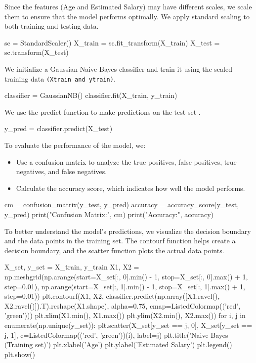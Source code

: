 Since the features (Age and Estimated Salary) may have different scales, we scale them to ensure that the model performs optimally. We apply standard scaling to both training and testing data.
	\begin{python}
		sc = StandardScaler()
		X_train = sc.fit_transform(X_train)
		X_test = sc.transform(X_test)
		
\end{python}



 We initialize a Gaussian Naive Bayes classifier and train it using the scaled training data \texttt{(Xtrain and ytrain)}.
 	\begin{python}
classifier = GaussianNB()
classifier.fit(X_train, y_train)
\end{python}

We use the predict function to make predictions on the test set .
\begin{python}
y_pred = classifier.predict(X_test)
\end{python}
To evaluate the performance of the model, we:
\begin{itemize}
\item Use a confusion matrix to analyze the true positives, false positives, true negatives, and false negatives.
\item Calculate the accuracy score, which indicates how well the model performs.
\end{itemize}
\begin{python}
cm = confusion_matrix(y_test, y_pred)
accuracy = accuracy_score(y_test, y_pred)
print("Confusion Matrix:\n", cm)
print("Accuracy:", accuracy)
\end{python}



	

To better understand the model's predictions, we visualize the decision boundary and the data points in the training set. The contourf function helps create a decision boundary, and the scatter function plots the actual data points.
\begin{python}
X_set, y_set = X_train, y_train
X1, X2 = np.meshgrid(np.arange(start=X_set[:, 0].min() - 1, stop=X_set[:, 0].max() + 1, step=0.01),
np.arange(start=X_set[:, 1].min() - 1, stop=X_set[:, 1].max() + 1, step=0.01))
plt.contourf(X1, X2, classifier.predict(np.array([X1.ravel(), X2.ravel()]).T).reshape(X1.shape),
alpha=0.75, cmap=ListedColormap(('red', 'green')))
plt.xlim(X1.min(), X1.max())
plt.ylim(X2.min(), X2.max())
for i, j in enumerate(np.unique(y_set)):
plt.scatter(X_set[y_set == j, 0], X_set[y_set == j, 1],
c=ListedColormap(('red', 'green'))(i), label=j)
plt.title('Naive Bayes (Training set)')
plt.xlabel('Age')
plt.ylabel('Estimated Salary')
plt.legend()
plt.show()
\end{python}

